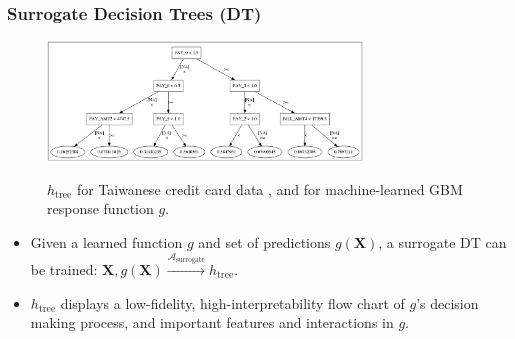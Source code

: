 \documentclass[11pt,
               aspectratio=169
               ]{beamer}
\begin{document}
		\begin{frame}[t]
		
			\frametitle{Surrogate Decision Trees (DT)}
			
			\begin{figure}[htb]
				\begin{center}
					\includegraphics[height=90pt]{img/dt_surrogate.png}
					\label{fig:dt_surrogate}
					\caption{$h_{\text{tree}}$ for Taiwanese credit card data \cite{uci}, and for machine-learned GBM response function $g$.}
				\end{center}
			\end{figure}
			
			\vspace{-20 pt}
			
			\begin{itemize}
				
				\item Given a learned function $g$ and set of predictions $g(\mathbf{X})$, a surrogate DT can be trained: $ \mathbf{X}, g(\mathbf{X}) \xrightarrow{\mathcal{A}_{\text{surrogate}}} h_{\text{tree}}$.
		
				\item $h_{\text{tree}}$ displays a low-fidelity, high-interpretability flow chart of $g$'s decision making process, and important features and interactions in $g$.	
			
			\end{itemize}
			
		\end{frame}
	
\end{document}
